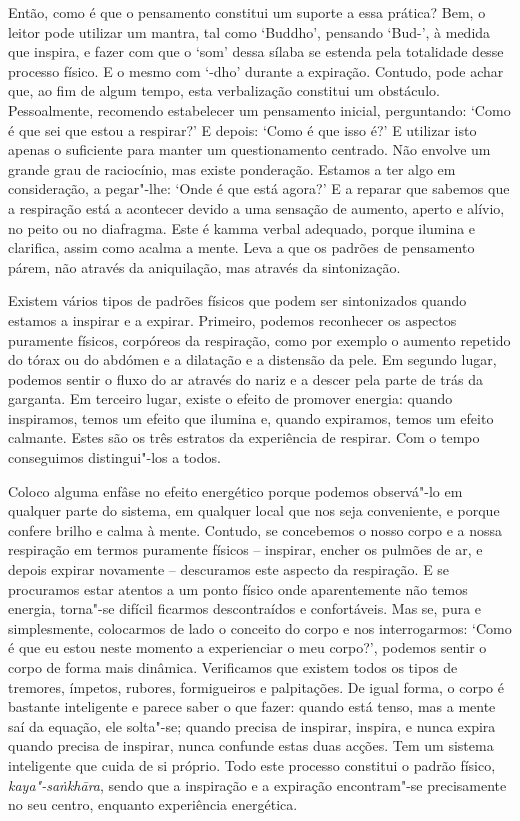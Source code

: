 Então, como é que o pensamento constitui um suporte a essa prática? Bem, o
leitor pode utilizar um mantra, tal como `Buddho', pensando `Bud-', à medida que
inspira, e fazer com que o `som' dessa sílaba se estenda pela totalidade desse
processo físico. E o mesmo com `-dho' durante a expiração. Contudo, pode achar
que, ao fim de algum tempo, esta verbalização constitui um obstáculo.
Pessoalmente, recomendo estabelecer um pensamento inicial, perguntando: `Como é
que sei que estou a respirar?' E depois: `Como é que isso é?' E utilizar isto
apenas o suficiente para manter um questionamento centrado. Não envolve um
grande grau de raciocínio, mas existe ponderação. Estamos a ter algo em
consideração, a pegar"-lhe: `Onde é que está agora?' E a reparar que sabemos que
a respiração está a acontecer devido a uma sensação de aumento, aperto e alívio,
no peito ou no diafragma. Este é kamma verbal adequado, porque ilumina e
clarifica, assim como acalma a mente. Leva a que os padrões de pensamento párem,
não através da aniquilação, mas através da sintonização.

Existem vários tipos de padrões físicos que podem ser sintonizados quando
estamos a inspirar e a expirar. Primeiro, podemos reconhecer os aspectos
puramente físicos, corpóreos da respiração, como por exemplo o aumento repetido
do tórax ou do abdómen e a dilatação e a distensão da pele. Em segundo lugar,
podemos sentir o fluxo do ar através do nariz e a descer pela parte de trás da
garganta. Em terceiro lugar, existe o efeito de promover energia: quando
inspiramos, temos um efeito que ilumina e, quando expiramos, temos um efeito
calmante. Estes são os três estratos da experiência de respirar. Com o tempo
conseguimos distingui"-los a todos.

\enlargethispage{\baselineskip}

Coloco alguma enfâse no efeito energético porque podemos observá"-lo em qualquer
parte do sistema, em qualquer local que nos seja conveniente, e porque confere
brilho e calma à mente. Contudo, se concebemos o nosso corpo e a nossa
respiração em termos puramente físicos -- inspirar, encher os pulmões de ar, e
depois expirar novamente -- descuramos este aspecto da respiração. E se
procuramos estar atentos a um ponto físico onde aparentemente não temos energia,
torna"-se difícil ficarmos descontraídos e confortáveis. Mas se, pura e
simplesmente, colocarmos de lado o conceito do corpo e nos interrogarmos: `Como
é que eu estou neste momento a experienciar o meu corpo?', podemos sentir o
corpo de forma mais dinâmica. Verificamos que existem todos os tipos de
tremores, ímpetos, rubores, formigueiros e palpitações. De igual forma, o corpo
é bastante inteligente e parece saber o que fazer: quando está tenso, mas a
mente saí da equação, ele solta"-se; quando precisa de inspirar, inspira, e nunca
expira quando precisa de inspirar, nunca confunde estas duas acções. Tem um
sistema inteligente que cuida de si próprio. Todo este processo constitui o
padrão físico, \emph{kaya"-saṅkhāra}, sendo que a inspiração e a expiração
encontram"-se precisamente no seu centro, enquanto experiência energética.

